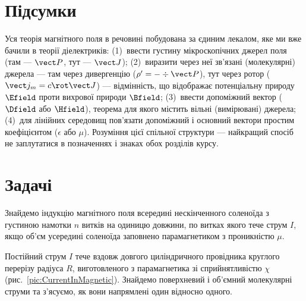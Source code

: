\section*{Підсумки}
{}

Уся теорія магнітного поля в речовині побудована за єдиним лекалом, яке ми вже бачили в теорії діелектриків: (1)~ввести густину
мікроскопічних джерел поля (там --- $\vect P$, тут --- $\vect J$); (2)~виразити через неї зв'язані (молекулярні) джерела --- там через
дивергенцію ($\rho' = -\div\vect P$), тут через ротор ($\vect j_m = c\rot\vect J$) --- відмінність, що відображає потенціальну природу $\Efield$
проти вихрової природи $\Bfield$; (3)~ввести допоміжний вектор ($\Dfield$ або $\Hfield$), теорема для якого містить  вільні
(вимірювані) джерела; (4)~для лінійних середовищ пов'язати допоміжний і основний вектори простим коефіцієнтом ($\epsilon$ або $\mu$). Розуміння
цієї спільної структури --- найкращий спосіб не заплутатися в позначеннях і знаках обох розділів курсу.


\section*{Задачі}
{}


\begin{problem}%
Знайдемо індукцію магнітного поля всередині нескінченного соленоїда з густиною намотки $n$ витків на одиницю довжини, по витках якого тече струм
$I$, якщо об'єм усередині соленоїда заповнено парамагнетиком з проникністю $\mu$.
\end{problem}

\begin{problem}%
Постійний струм $I$ тече вздовж довгого циліндричного провідника круглого перерізу радіуса $R$, виготовленого з парамагнетика зі сприйнятливістю
$\chi$ (рис.~\ref{pic:CurrentInMagnetic}). Знайдемо поверхневий і об'ємний молекулярні струми та з'ясуємо, як вони напрямлені один відносно
одного.
\end{problem}


